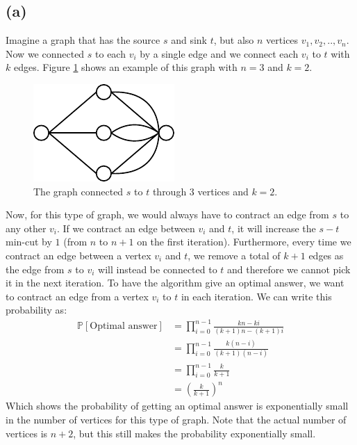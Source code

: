 \documentclass[a4paper]{article}
\begin{document}
\subsection*{(a)}
Imagine a graph that has the source $s$ and sink $t$, but also $n$ vertices $v_1,v_2,..,v_n$. Now we connected $s$ to each $v_i$ by a single edge and we connect each $v_i$ to $t$ with $k$ edges. Figure \ref{fig2} shows an example of this graph with $n=3$ and $k=2$.
\begin{figure}[H]
  \centering
  \includegraphics[scale=2]{fig2.pdf}
  \caption{The graph connected $s$ to $t$ through $3$ vertices and $k=2$.}
  \label{fig2}
\end{figure}
Now, for this type of graph, we would always have to contract an edge from $s$ to any other $v_i$. If we contract an edge between $v_i$ and $t$, it will increase the $s-t$ min-cut by $1$ (from $n$ to $n+1$ on the first iteration). Furthermore, every time we contract an edge between a vertex $v_i$ and $t$, we remove a total of $k+1$ edges as the edge from $s$ to $v_i$ will instead be connected to $t$ and therefore we cannot pick it in the next iteration. To have the algorithm give an optimal answer, we want to contract an edge from a vertex $v_i$ to $t$ in each iteration. We can write this probability as:
\begin{align*}
  \mathbb{P}\left[ \mbox{Optimal answer} \right] &= \prod_{i=0}^{n-1} \frac{kn-ki}{(k+1)n-(k+1)i} \\
                                                 &= \prod_{i=0}^{n-1} \frac{k(n-i)}{(k+1)(n-i)} \\
                                                 &= \prod_{i=0}^{n-1} \frac{k}{k+1} \\
                                                 &= \left( \frac{k}{k+1}\right) ^n
\end{align*}
Which shows the probability of getting an optimal answer is exponentially small in the number of vertices for this type of graph. Note that the actual number of vertices is $n+2$, but this still makes the probability exponentially small.
\end{document}

